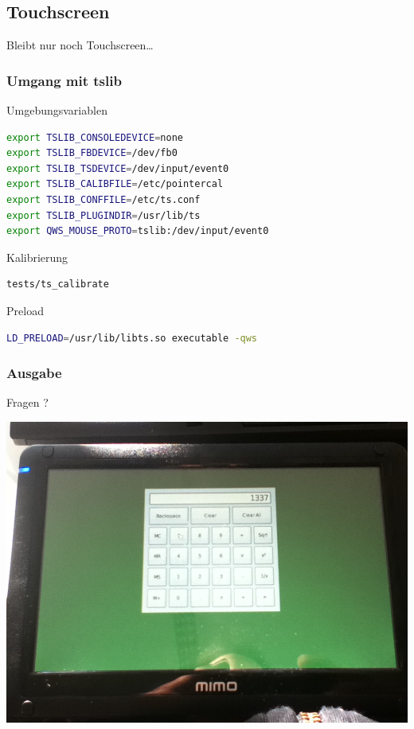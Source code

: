 \documentclass{beamer}
\begin{document}
  \subsection{Touchscreen}
  \begin{frame}
    \begin{center}
    Bleibt nur noch Touchscreen\ldots
    \end{center}
  \end{frame}
	\begin{frame}
    \frametitle{Umgang mit tslib}
    \begin{block}{Umgebungsvariablen}
      \begin{lstlisting}[language=Bash]
export TSLIB_CONSOLEDEVICE=none
export TSLIB_FBDEVICE=/dev/fb0
export TSLIB_TSDEVICE=/dev/input/event0
export TSLIB_CALIBFILE=/etc/pointercal
export TSLIB_CONFFILE=/etc/ts.conf
export TSLIB_PLUGINDIR=/usr/lib/ts
export QWS_MOUSE_PROTO=tslib:/dev/input/event0
      \end{lstlisting}
    \end{block}
    \begin{block}{Kalibrierung}
      \begin{lstlisting}[language=Bash]
        tests/ts_calibrate
      \end{lstlisting}
    \end{block}
    \begin{block}{Preload}
      \begin{lstlisting}[language=Bash]
LD_PRELOAD=/usr/lib/libts.so executable -qws
      \end{lstlisting}
    \end{block}
  \end{frame}

	\begin{frame}
		\frametitle{Ausgabe}
		\begin{center}
			\Huge{Fragen ?}
		\end{center}
		\begin{center}
			\includegraphics[scale=0.2]{img/mimo_calc.jpg}
		\end{center}
	\end{frame}
\end{document}
